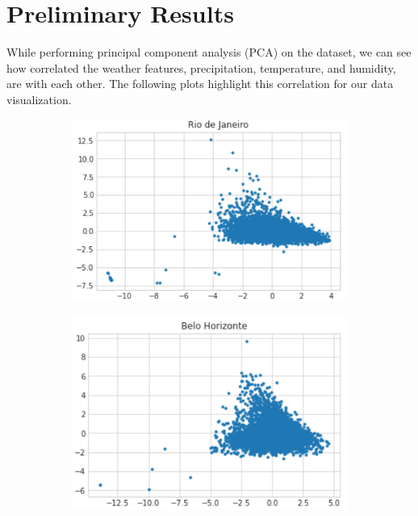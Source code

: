 \documentclass[11pt]{article}
\begin{document}
\section{Preliminary Results}
While performing principal component analysis (PCA) on the dataset, we can see how correlated the weather features, precipitation, temperature, and humidity, are with each other. The following plots highlight this correlation for our data visualization.
\begin{figure}
	\centering
	\begin{subfigure}[b]{0.3\textwidth}
		\centering
		\includegraphics[width=\textwidth]{riodejaneiro}
	\end{subfigure}
	\hfill
	\begin{subfigure}[b]{0.3\textwidth}
		\centering
		\includegraphics[width=\textwidth]{belo}
	\end{subfigure}

\end{figure}
\end{document}
